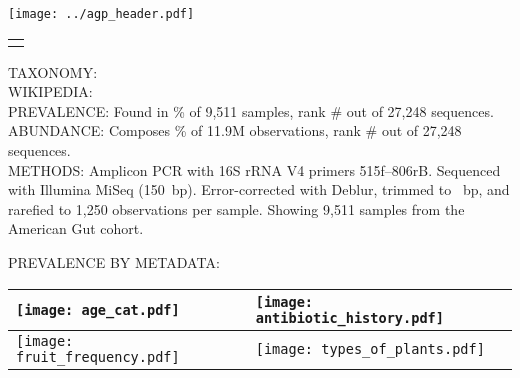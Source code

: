 \documentclass[9pt]{amsart}
\begin{document}


\begin{center}
\texttt{[image: ../agp\_header.pdf]}
\end{center}

\hspace{1.2cm}
\begin{tabular}{L{5in}}
\texttt{\sequence{}}
\end{tabular}

\begin{raggedright}
\begin{hangparas}{2em}{1}

    TAXONOMY:   \taxonomyGG{}
\\ \vspace{2mm}
    WIKIPEDIA:  \wikipedia{}
\\ \vspace{2mm}
    PREVALENCE: Found in \prevalencePercent{}\% of 9,511 samples, %
                rank \#\prevalenceRank{} out of 27,248 sequences. %
\\ \vspace{2mm}
    ABUNDANCE:  Composes \abundancePercent{}\% of 11.9M observations,
                rank \#\abundanceRank{} out of 27,248 sequences. %
\\ \vspace{2mm}
    METHODS:    Amplicon PCR with 16S rRNA V4 primers 515f--806rB.
    			Sequenced with Illumina MiSeq (150~bp).
                Error-corrected with Deblur, trimmed to \trimLength{}~bp, and
                rarefied to 1,250 observations per sample. %
                Showing 9,511 samples from the American Gut cohort. %
\end{hangparas}

PREVALENCE BY METADATA:

\begin{tabular}{| L{6cm} | L{6cm} |}
\hline
\texttt{[image: age\_cat.pdf]} & 
\texttt{[image: antibiotic\_history.pdf]}\\ 
\hline
\texttt{[image: fruit\_frequency.pdf]} &
\texttt{[image: types\_of\_plants.pdf]}\\
\hline
\end{tabular}
\end{raggedright}


\end{document}
